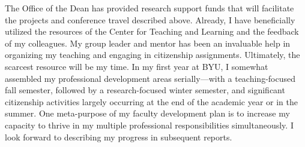 \documentclass[11pt,article,oneside]{memoir}
\begin{document}
The Office of the Dean has provided research support funds that will
facilitate the projects and conference travel described above. Already,
I have beneficially utilized the resources of the Center for Teaching
and Learning and the feedback of my colleagues. My group leader and
mentor has been an invaluable help in organizing my teaching and
engaging in citizenship assignments. Ultimately, the scarcest resource
will be my time. In my first year at BYU, I somewhat assembled my
professional development areas serially---with a teaching-focused fall
semester, followed by a research-focused winter semester, and
significant citizenship activities largely occurring at the end of the
academic year or in the summer. One meta-purpose of my faculty
development plan is to increase my capacity to thrive in my multiple
professional responsibilities simultaneously. I look forward to
describing my progress in subsequent reports.

\hypertarget{refs}{}
\end{document}
